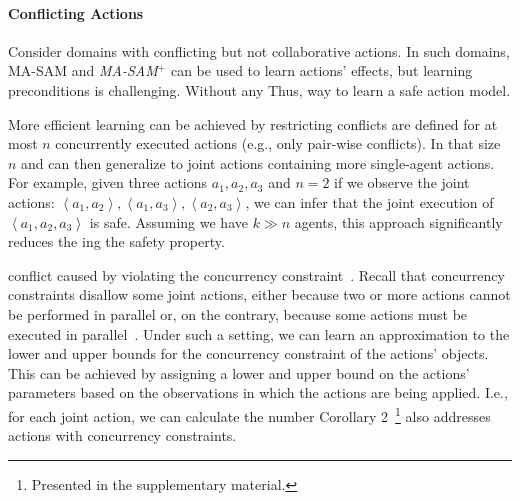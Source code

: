 \documentclass[letterpaper]{article} %
\theoremstyle{definition}
\theoremstyle{remark}
\newcommand{\tuple}[1]{\ensuremath{\left \langle #1 \right \rangle }}
\newcommand{\masam}{\ac{MA-SAM}\xspace}
\newcommand{\cmasam}{\textit{MA-SAM\ensuremath{^+}}\xspace}
\begin{document}

\paragraph{Conflicting Actions}
Consider domains with conflicting but not collaborative actions.
In such domains, \masam and \cmasam can be used to learn actions' effects, but learning preconditions is challenging.
Without any  
Thus,  way to learn a safe action model.

More efficient learning can be achieved by restricting  conflicts are defined for at most $n$ concurrently executed actions (e.g., only pair-wise conflicts). In that  size $n$ and can then generalize to joint actions containing more single-agent actions.
For example, given three actions $a_1,a_2,a_3$ and $n=2$ if we observe the joint actions: $\tuple{a_1,a_2}, \tuple{a_1,a_3}, \tuple{a_2,a_3}$, we can infer that the joint execution of $\tuple{a_1,a_2,a_3}$ is safe. Assuming we have $k \gg n$ agents, this approach significantly reduces the ing the safety property.

 conflict caused by violating the concurrency constraint~\cite{boutilier2001partial}. Recall that concurrency constraints disallow some joint actions, either because two or more actions cannot be performed in parallel or, on the contrary, because some actions must be executed in parallel~\cite{boutilier2001partial,crosby2014single}. Under such a setting, we can learn an approximation to the lower and upper bounds for the concurrency constraint of the actions' objects. This can be achieved by assigning a lower and upper bound on the actions' parameters based on the observations in which the actions are being applied. I.e., for each joint action, we can calculate the number   Corollary 2~\footnote{Presented in the supplementary material.} also addresses actions with concurrency constraints.
\end{document}
